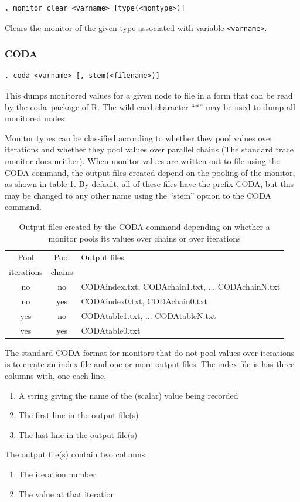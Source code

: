 \documentclass[11pt, a4paper, titlepage]{report}
\newcommand{\R}{\textsf{R}}
\newcommand{\CODA}{\textsf{coda}}
\begin{document}
\begin{verbatim}
. monitor clear <varname> [type(<montype>)]
\end{verbatim}
Clears the monitor of the given type associated with variable
\texttt{<varname>}. 

\subsubsection{CODA}
\label{coda}

\begin{verbatim}
. coda <varname> [, stem(<filename>)]
\end{verbatim}
This dumps monitored values for a given node to file in a form that
can be read by the \CODA\ package of \R.  The wild-card character
``*'' may be used to dump all monitored nodes

Monitor types can be classified according to whether they pool values
over iterations and whether they pool values over parallel chains (The
standard trace monitor does neither). When monitor values are written
out to file using the CODA command, the output files created depend on
the pooling of the monitor, as shown in table \ref{table:coda}. By
default, all of these files have the prefix CODA, but this may be
changed to any other name using the ``stem'' option to the CODA
command.

\begin{table}[h]
\begin{tabular}{ccl}
\hline
Pool       & Pool   & Output files \\
iterations & chains &              \\
\hline
no         & no     & CODAindex.txt, CODAchain1.txt, ... 
                      CODAchainN.txt \\
no         & yes    & CODAindex0.txt, CODAchain0.txt \\
yes        & no     & CODAtable1.txt, ... CODAtableN.txt \\
yes        & yes    & CODAtable0.txt \\
\hline
\end{tabular}
\caption{Output files created by the CODA command depending on whether
a monitor pools its values over chains or over iterations \label{table:coda}}
\end{table}

The standard CODA format for monitors that do not pool values over
iterations is to create an index file and one or more output files.
The index file is has three columns with, one each line,
\begin{enumerate}
\item A string giving the name of the (scalar) value being recorded
\item The first line in the output file(s)
\item The last line in the output file(s)
\end{enumerate}
The output file(s) contain two columns:
\begin{enumerate}
\item The iteration number
\item The value at that iteration
\end{enumerate}
\end{document}
